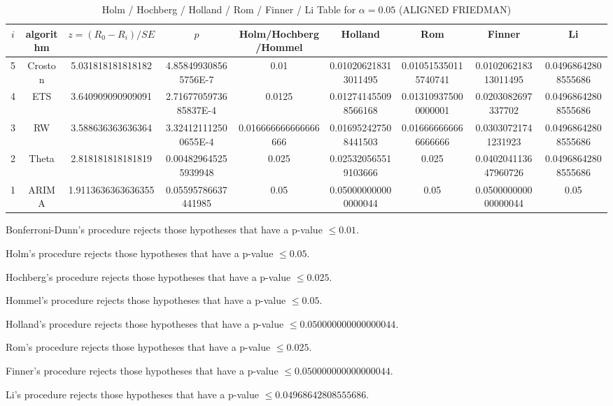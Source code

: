 \documentclass[a4paper,10pt]{article}
\begin{document}
\begin{landscape}
\begin{table}[!htp]
\centering\scriptsize
\caption{Holm / Hochberg / Holland / Rom / Finner / Li Table for $\alpha=0.05$ (ALIGNED FRIEDMAN)}
\begin{tabular}{ccccccccc}
$i$&algorithm&$z=(R_0 - R_i)/SE$&$p$&Holm/Hochberg/Hommel&Holland&Rom&Finner&Li\\
\hline
5&Croston&5.031818181818182&4.858499308565756E-7&0.01&0.010206218313011495&0.010515350115740741&0.010206218313011495&0.04968642808555686\\
4&ETS&3.640909090909091&2.7167705973685837E-4&0.0125&0.012741455098566168&0.013109375000000001&0.0203082697337702&0.04968642808555686\\
3&RW&3.588636363636364&3.324121112500655E-4&0.016666666666666666&0.016952427508441503&0.016666666666666666&0.03030721741231923&0.04968642808555686\\
2&Theta&2.818181818181819&0.004829645255939948&0.025&0.025320565519103666&0.025&0.040204113647960726&0.04968642808555686\\
1&ARIMA&1.9113636363636355&0.05595786637441985&0.05&0.050000000000000044&0.05&0.050000000000000044&0.05\\
\hline
\end{tabular}
\end{table}
Bonferroni-Dunn's procedure rejects those hypotheses that have a p-value $\le0.01$.


Holm's procedure rejects those hypotheses that have a p-value $\le0.05$.


Hochberg's procedure rejects those hypotheses that have a p-value $\le0.025$.


Hommel's procedure rejects those hypotheses that have a p-value $\le0.05$.


Holland's procedure rejects those hypotheses that have a p-value $\le0.050000000000000044$.


Rom's procedure rejects those hypotheses that have a p-value $\le0.025$.


Finner's procedure rejects those hypotheses that have a p-value $\le0.050000000000000044$.


Li's procedure rejects those hypotheses that have a p-value $\le0.04968642808555686$.



\newpage


\end{landscape}
\end{document}
